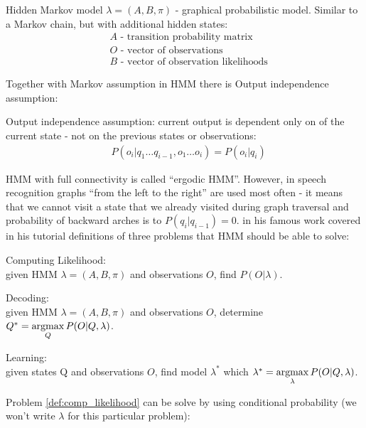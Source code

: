 \begin{definition} Hidden Markov model $\lambda=(A,B,\pi)$ - graphical probabilistic model. Similar to a Markov chain, but with additional hidden states:
	\begin{align}
		&A \text{ - transition probability matrix } \\
		&O \text{ - vector of observations} \\
		&B \text{ - vector of observation likelihoods}
	\end{align}
\end{definition}
Together with Markov assumption in HMM there is Output independence assumption: 

\begin{definition} Output independence assumption: current output is dependent only on of the current state - not on the previous states or observations: 
	\begin{align}
		& P(o_i|q_1 \ldots q_{i-1},o_1 \ldots o_i)=P(o_i|q_i)
	\end{align}
\end{definition} 
HMM with full connectivity is called ``ergodic HMM''. However, in speech recognition graphs ``from the left to the right'' are used most often - it means that we cannot visit a state that we already visited during graph traversal and probability of backward arches is to $P(q_i|q_{i-1})=0$. \textcite{rabiner_tutorial_1989} in his famous work covered in his tutorial definitions of three problems that HMM should be able to solve:


\begin{definition} Computing Likelihood: \\
	\label{def:comp_likelihood}
	given HMM $\lambda = (A,B,\pi)$ and observations $O$, find $P(O|\lambda)$.	
\end{definition}

\begin{definition} Decoding: \\
	\label{def:hmm_decoding}
	given HMM $\lambda = (A,B,\pi)$ and observations $O$, determine $Q^*=\operatorname*{argmax}\limits_Q P(O|Q,\lambda)$.	
\end{definition}

\begin{definition} Learning: \\
	given states Q and observations $O$, find model $\lambda^*$ which $\lambda^*=\operatorname*{argmax}\limits_\lambda P(O|Q,\lambda)$.	
\end{definition}

Problem \ref{def:comp_likelihood} can be solve by using conditional probability (we won't write $\lambda$ for this particular problem):


